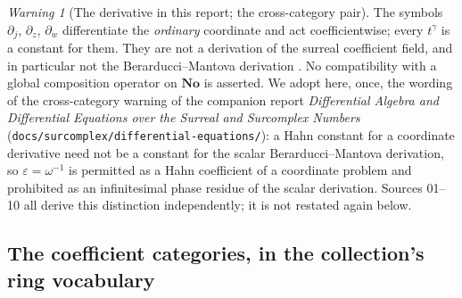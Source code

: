 \documentclass[11pt,letterpaper]{article}
\theoremstyle{definition}
\theoremstyle{remark}
\newtheorem{warning}[warning]{Warning}
\newcommand{\No}{\mathbf{No}}
\newcommand{\eps}{\varepsilon}
\numberwithin{equation}{section}
\begin{document}
\begin{warning}[The derivative in this report; the cross-category pair]
\label{dyn:warn:derivative}
The symbols $\partial_j$, $\partial_z$, $\partial_w$ differentiate the
\emph{ordinary} coordinate and act coefficientwise; every $t^{\gamma}$ is a
constant for them. They are not a derivation of the surreal coefficient
field, and in particular not the Berarducci--Mantova derivation
\cite{BM}. No compatibility with a global composition operator on $\No$ is
asserted. We adopt here, once, the wording of the cross-category warning of
the companion report \emph{Differential Algebra and Differential Equations
over the Surreal and Surcomplex Numbers}
(\texttt{docs/surcomplex/differential-equations/}): a Hahn constant for a
coordinate derivative need not be a constant for the scalar
Berarducci--Mantova derivation, so $\eps=\omega^{-1}$ is permitted as a
Hahn coefficient of a coordinate problem and prohibited as an infinitesimal
phase residue of the scalar derivation. Sources 01--10 all derive this
distinction independently; it is not restated again below.
\end{warning}

\subsection{The coefficient categories, in the collection's ring vocabulary}
\label{dyn:subsec:rings}
\end{document}
